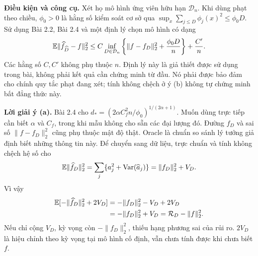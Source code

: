\textbf{Điều kiện và công cụ.} Xét họ mô hình ứng viên hữu hạn $\mathcal D_n$.
Khi dùng phạt theo chiều, $\phi_0>0$ là hằng số kiểm soát cơ sở qua
$\sup_x\sum_{j\leq D}\phi_j(x)^2\leq\phi_0D$.
Sử dụng Bài 2.2, Bài 2.4 và một định lý chọn mô hình có dạng
\[
\mathbb E\|\widehat f_{\widehat D}-f\|_2^2
\leq C\inf_{D\in\mathcal D_n}
\left\{\|f-f_D\|_2^2+\frac{\phi_0D}{n}\right\}+\frac{C'}n.
\]
Các hằng số $C,C'$ không phụ thuộc $n$.
Định lý này là giả thiết được sử dụng trong bài, không phải kết quả cần chứng minh từ đầu.
Nó phải được bảo đảm cho chính quy tắc phạt đang xét; tính không chệch ở ý (b)
không tự chứng minh bất đẳng thức này.

\textbf{Lời giải ý (a).}
Bài 2.4 cho $d_*=(2\alpha C_f^2n/\phi_0)^{1/(2\alpha+1)}$.
Muốn dùng trực tiếp cần biết $\alpha$ và $C_f$, trong khi mẫu không cho sẵn các đại lượng đó.
Đường $f_D$ và sai số $\|f-f_D\|_2^2$ cũng phụ thuộc mật độ thật.
Oracle là chuẩn so sánh lý tưởng giả định biết những thông tin này.
Để chuyển sang dữ liệu, trực chuẩn và tính không chệch hệ số cho
\[
\mathbb E\|\widehat f_D\|_2^2=\sum_j\{a_j^2+\operatorname{Var}(\widehat a_j)\}
=\|f_D\|_2^2+V_D.
\]
Vì vậy
\begin{align*}
\mathbb E[-\|\widehat f_D\|_2^2+2V_D]
&=-\|f_D\|_2^2-V_D+2V_D\\
&=-\|f_D\|_2^2+V_D=\mathcal R_D-\|f\|_2^2.
\end{align*}
Nếu chỉ cộng $V_D$, kỳ vọng còn $-\|f_D\|_2^2$, thiếu hạng phương sai của rủi ro.
$2V_D$ là hiệu chỉnh theo kỳ vọng tại mô hình cố định, vẫn chưa tính được khi chưa biết $f$.

